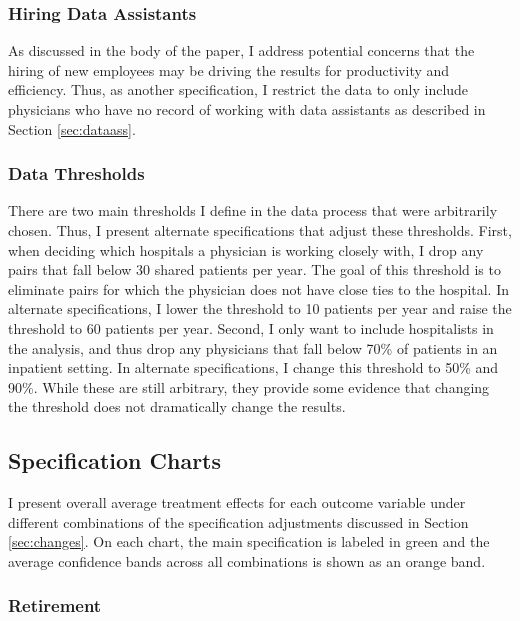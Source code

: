 \documentclass[12pt]{article}
\begin{document}
\subsubsection{Hiring Data Assistants}

As discussed in the body of the paper, I address potential concerns that the hiring of new employees may be driving the results for productivity and efficiency. Thus, as another specification, I restrict the data to only include physicians who have no record of working with data assistants as described in Section \ref{sec:dataass}. 

\subsubsection{Data Thresholds}

There are two main thresholds I define in the data process that were arbitrarily chosen. Thus, I present alternate specifications that adjust these thresholds. First, when deciding which hospitals a physician is working closely with, I drop any pairs that fall below 30 shared patients per year. The goal of this threshold is to eliminate pairs for which the physician does not have close ties to the hospital. In alternate specifications, I lower the threshold to 10 patients per year and raise the threshold to 60 patients per year. Second, I only want to include hospitalists in the analysis, and thus drop any physicians that fall below 70\% of patients in an inpatient setting. In alternate specifications, I change this threshold to 50\% and 90\%. While these are still arbitrary, they provide some evidence that changing the threshold does not dramatically change the results. 


\subsection{Specification Charts}\label{sec:chart}

I present overall average treatment effects for each outcome variable under different combinations of the specification adjustments discussed in Section \ref{sec:changes}. On each chart, the main specification is labeled in green and the average confidence bands across all combinations is shown as an orange band. 

\subsubsection{Retirement}
\end{document}
